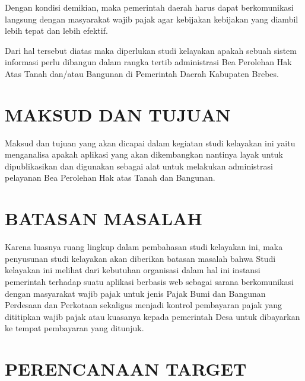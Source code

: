 \documentclass[pdftex,12pt, oneside]{article}
\begin{document}
Dengan kondisi demikian, maka pemerintah daerah harus dapat berkomunikasi langsung dengan masyarakat wajib pajak agar kebijakan kebijakan yang diambil lebih tepat dan lebih efektif.

Dari hal tersebut diatas maka diperlukan studi kelayakan apakah sebuah sistem informasi perlu dibangun dalam rangka tertib administrasi Bea Perolehan Hak Atas Tanah dan/atau Bangunan di Pemerintah Daerah Kabupaten Brebes.  

\section{MAKSUD DAN TUJUAN}

Maksud dan tujuan yang akan dicapai dalam kegiatan studi kelayakan ini yaitu menganalisa apakah aplikasi yang akan dikembangkan nantinya layak untuk dipublikasikan dan digunakan sebagai alat untuk melakukan administrasi pelayanan Bea Perolehan Hak atas Tanah dan Bangunan.

\section{BATASAN MASALAH}

Karena luasnya ruang lingkup dalam pembahasan studi kelayakan ini, maka penyusunan studi kelayakan akan diberikan batasan masalah bahwa Studi kelayakan ini melihat dari kebutuhan organisasi dalam hal ini instansi pemerintah terhadap suatu aplikasi berbasis web sebagai sarana berkomunikasi dengan masyarakat wajib pajak untuk jenis Pajak Bumi dan Bangunan Perdesaan dan Perkotaan sekaligus menjadi kontrol pembayaran pajak yang dititipkan wajib pajak atau kuasanya kepada pemerintah Desa untuk dibayarkan ke tempat pembayaran yang ditunjuk.
  
\section{PERENCANAAN TARGET}

\end{document}
